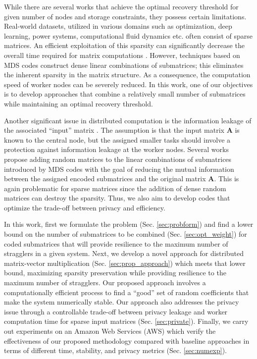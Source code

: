 \documentclass[conference]{IEEEtran}
\theoremstyle{definition}
\newcommand{\bfA}{\mathbf{A}}
\begin{document}
While there are several works that achieve the optimal recovery threshold \cite{yu2017polynomial, 8849468, 8919859, das2019random} for given number of nodes and storage constraints, they possess certain limitations. Real-world datasets, utilized in various domains such as optimization, deep learning, power systems, computational fluid dynamics etc. often consist of sparse matrices. An efficient exploitation of this sparsity can significantly decrease the overall time required for matrix computations \cite{wang2018coded}. However, techniques based on MDS codes \cite{yu2017polynomial, 8849468, 8919859, das2019random} construct dense linear combinations of submatrices; this eliminates the inherent sparsity in the matrix structure. As a consequence, the computation speed of worker nodes can be severely reduced. In this work, one of our objectives is to develop approaches that combine a relatively small number of submatrices while maintaining an optimal recovery threshold.

Another significant issue in distributed computation is the information leakage of the associated ``input'' matrix \cite{tandon2018secure, aliasgari2020private, hollanti2022secure, yu2021entangled}. The assumption is that the input matrix $\bfA$ is known to the central node, but the assigned smaller tasks should involve a protection against information leakage at the worker nodes. Several works \cite{tandon2018secure, aliasgari2020private, hollanti2022secure} propose adding random matrices to the linear combinations of submatrices introduced by MDS codes with the goal of reducing the mutual information between the assigned encoded submatrices and the original matrix $\bfA$. This is again problematic for sparse matrices since the addition of dense random matrices can destroy the sparsity. Thus, we also aim to develop codes that optimize the trade-off between privacy and efficiency.

In this work, first we formulate the problem (Sec. \ref{sec:probform}) and find a lower bound on the number of submatrices to be combined (Sec. \ref{sec:opt_weight}) for coded submatrices that will provide resilience to the maximum number of stragglers in a given system. Next, we develop a novel approach for distributed matrix-vector multiplication (Sec. \ref{sec:prop_approach}) which meets that lower bound, maximizing sparsity preservation while providing resilience to the maximum number of stragglers. Our proposed approach involves a computationally efficient process to find a ``good'' set of random coefficients that make the system numerically stable. Our approach also addresses the privacy issue through a controllable trade-off between privacy leakage and worker computation time for sparse input matrices (Sec. \ref{sec:private}). Finally, we carry out experiments on an Amazon Web Services (AWS) which verify the effectiveness of our proposed methodology compared with baseline approaches in terms of different time, stability, and privacy metrics (Sec. \ref{sec:numexp}). 
\end{document}
